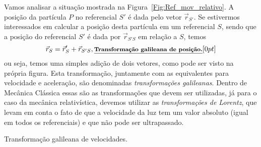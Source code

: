 Vamos analisar a situação mostrada na Figura~\ref{Fig:Ref_mov_relativo}. A posição da partícula $P$ no referencial $S'$ é dada pelo vetor $\vec{r}_{S'}$. Se estivermos interessados em calcular a posição desta partícula em um referencial $S$, sendo que a posição do referencial $S'$ é dada por $\vec{r}_{S'S}$ em relação a $S$, temos
\begin{equation}
  \vec{r}_S = \vec{r}_S' + \vec{r}_{S'S},\relax{\footnotesize\emph{\textbf{Transformação galileana de posição.}}}[0pt]
\end{equation}
%
ou seja, temos uma simples adição de dois vetores, como pode ser visto na própria figura. Esta transformação, juntamente com as equivalentes para velocidade e aceleração, são denominadas \emph{transformações galileanas}. Dentro de Mecânica Clássica essas são as transformações que devem ser utilizadas, já para o caso da mecânica relativística, devemos utilizar as \emph{transformações de Lorentz}, que levam em conta o fato de que a velocidade da luz tem um valor absoluto (igual em todos os referenciais) e que não pode ser ultrapassado.

\begin{marginfigure}
\centering
{}
\caption{Transformação galileana de velocidades.}
\end{marginfigure}

